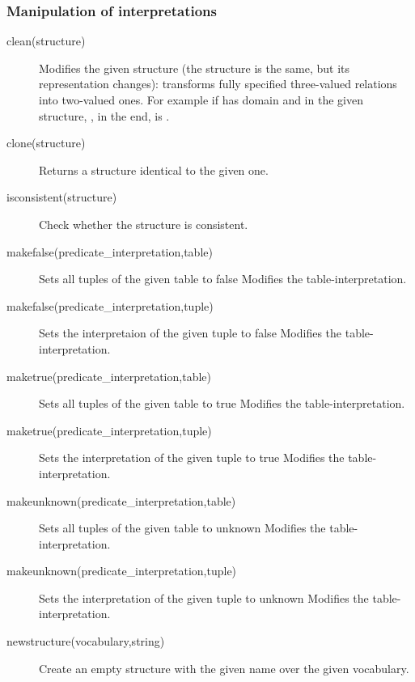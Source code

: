 \documentclass[a4]{article}
\begin{document}
\subsubsection{Manipulation of interpretations}
\begin{description}
	\item[clean(structure)]
		Modifies the given structure (the structure is the same, but its representation changes): transforms fully specified three-valued relations into two-valued ones.  For example if  has domain \code[1..2] and in the given structure, , in the end,  is .
	\item[clone(structure)]
		Returns a structure identical to the given one.
	\item[isconsistent(structure)]
 		Check whether the structure is consistent.
	\item[makefalse(predicate\_interpretation,table)]
 		Sets all tuples of the given table to false
 		Modifies the table-interpretation.
	\item[ makefalse(predicate\_interpretation,tuple)]
 		Sets the interpretaion of the given tuple to false
 		Modifies the table-interpretation.
	\item[ maketrue(predicate\_interpretation,table)]
 		Sets all tuples of the given table to true
 		Modifies the table-interpretation.
	\item[ maketrue(predicate\_interpretation,tuple)]
 		Sets the interpretation of the given tuple to true
 		Modifies the table-interpretation.
	\item[ makeunknown(predicate\_interpretation,table)]
 		Sets all tuples of the given table to unknown
 		Modifies the table-interpretation.
	\item[ makeunknown(predicate\_interpretation,tuple)]
 		Sets the interpretation of the given tuple to unknown
 		Modifies the table-interpretation.
	\item[newstructure(vocabulary,string)]
 		Create an empty structure with the given name over the given vocabulary.
\end{description}
\end{document}
